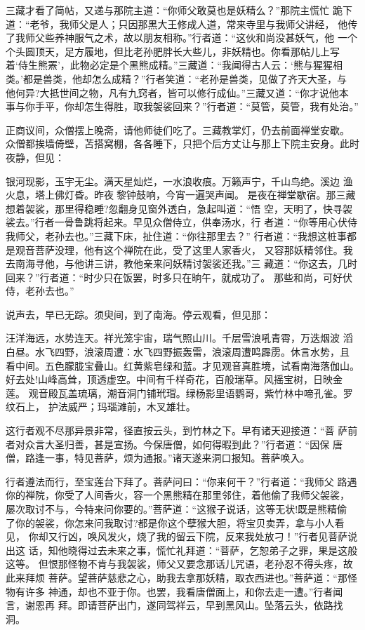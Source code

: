 三藏才看了简帖，又递与那院主道：“你师父敢莫也是妖精么？”那院主慌忙
跪下道：“老爷，我师父是人；只因那黑大王修成人道，常来寺里与我师父讲经，
他传了我师父些养神服气之术，故以朋友相称。”行者道：“这伙和尚没甚妖气，他
一个个头圆顶天，足方履地，但比老孙肥胖长大些儿，非妖精也。你看那帖儿上写
着‘侍生熊罴’，此物必定是个黑熊成精。”三藏道：“我闻得古人云：‘熊与猩猩相
类。’都是兽类，他却怎么成精？”行者笑道：“老孙是兽类，见做了齐天大圣，与
他何异?大抵世间之物，凡有九窍者，皆可以修行成仙。”三藏又道：“你才说他本
事与你手平，你却怎生得胜，取我袈裟回来？”行者道：“莫管，莫管，我有处治。”

正商议间，众僧摆上晚斋，请他师徒们吃了。三藏教掌灯，仍去前面禅堂安歇。
众僧都挨墙倚壁，苫搭窝棚，各各睡下，只把个后方丈让与那上下院主安身。此时
夜静，但见：

银河现影，玉宇无尘。满天星灿烂，一水浪收痕。万籁声宁，千山鸟绝。溪边
渔火息，塔上佛灯昏。昨夜黎钟鼓响，今宵一遍哭声闻。
是夜在禅堂歇宿。那三藏想着袈裟，那里得稳睡?忽翻身见窗外透白，急起叫道：“悟
空，天明了，快寻袈裟去。”行者一骨鲁跳将起来。早见众僧侍立，供奉汤水，行
者道：“你等用心伏侍我师父，老孙去也。”三藏下床，扯住道：“你往那里去？”
行者道：“我想这桩事都是观音菩萨没理，他有这个禅院在此，受了这里人家香火，
又容那妖精邻住。我去南海寻他，与他讲三讲，教他亲来问妖精讨袈裟还我。”三
藏道：“你这去，几时回来？”行者道：“时少只在饭罢，时多只在晌午，就成功了。
那些和尚，可好伏侍，老孙去也。”

说声去，早已无踪。须臾间，到了南海。停云观看，但见那：

汪洋海远，水势连天。祥光笼宇宙，瑞气照山川。千层雪浪吼青霄，万迭烟波
滔白昼。水飞四野，浪滚周遭：水飞四野振轰雷，浪滚周遭鸣霹雳。休言水势，且
看中间。五色朦胧宝叠山。红黄紫皂绿和蓝。才见观音真胜境，试看南海落伽山。
好去处!山峰高耸，顶透虚空。中间有千样奇花，百般瑞草。风摇宝树，日映金莲。
观音殿瓦盖琉璃，潮音洞门铺玳瑁。绿杨影里语鹦哥，紫竹林中啼孔雀。罗纹石上，
护法威严；玛瑙滩前，木叉雄壮。

这行者观不尽那异景非常，径直按云头，到竹林之下。早有诸天迎接道：“菩
萨前者对众言大圣归善，甚是宣扬。今保唐僧，如何得暇到此？”行者道：“因保
唐僧，路逢一事，特见菩萨，烦为通报。”诸天遂来洞口报知。菩萨唤入。

行者遵法而行，至宝莲台下拜了。菩萨问曰：“你来何干？”行者道：“我师父
路遇你的禅院，你受了人间香火，容一个黑熊精在那里邻住，着他偷了我师父袈裟，
屡次取讨不与，今特来问你要的。”菩萨道：“这猴子说话，这等无状!既是熊精偷
了你的袈裟，你怎来问我取讨?都是你这个孽猴大胆，将宝贝卖弄，拿与小人看见，
你却又行凶，唤风发火，烧了我的留云下院，反来我处放刁！”行者见菩萨说出这
话，知他晓得过去未来之事，慌忙礼拜道：“菩萨，乞恕弟子之罪，果是这般这等。
但恨那怪物不肯与我袈裟，师父又要念那话儿咒语，老孙忍不得头疼，故此来拜烦
菩萨。望菩萨慈悲之心，助我去拿那妖精，取衣西进也。”菩萨道：“那怪物有许多
神通，却也不亚于你。也罢，我看唐僧面上，和你去走一遭。”行者闻言，谢恩再
拜。即请菩萨出门，遂同驾祥云，早到黑风山。坠落云头，依路找洞。

